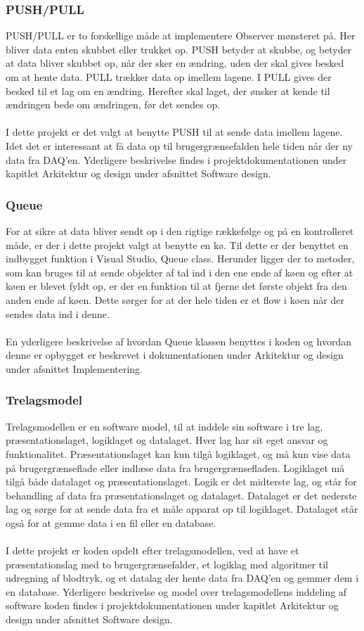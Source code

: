 \subsubsection{PUSH/PULL}
PUSH/PULL er to forskellige måde at implementere Observer mønsteret på. Her bliver data enten skubbet eller trukket op. PUSH betyder at skubbe, og betyder at data bliver skubbet op, når der sker en ændring, uden der skal gives besked om at hente data. PULL trækker data op imellem lagene. I PULL gives der besked til et lag om en ændring. Herefter skal laget, der ønsker at kende til ændringen bede om ændringen, før det sendes op.\\
\\
I dette projekt er det valgt at benytte PUSH til at sende data imellem lagene. Idet det er interessant at få data op til brugergrænsefalden hele tiden når der ny data fra DAQ’en. Yderligere beskrivelse findes i projektdokumentationen under kapitlet Arkitektur og design under afsnittet Software design. 
\subsubsection{Queue}
For at sikre at data bliver sendt op i den rigtige rækkefølge og på en kontrolleret måde, er der i dette projekt valgt at benytte en kø. Til dette er der benyttet en indbygget funktion i Visual Studio, Queue class. Herunder ligger der to metoder, som kan bruges til at sende objekter af tal ind i den ene ende af køen og efter at køen er blevet fyldt op, er der en funktion til at fjerne det første objekt fra den anden ende af køen. Dette sørger for at der hele tiden er et flow i køen når der sendes data ind i denne. \\
\\
En yderligere beskrivelse af hvordan Queue klassen benyttes i koden og hvordan denne er opbygget er beskrevet i dokumentationen under Arkitektur og design under afsnittet Implementering.
\subsubsection{Trelagsmodel}
Trelagsmodellen er en software model, til at inddele sin software i tre lag, præsentationslaget, logiklaget og datalaget. Hver lag har sit eget ansvar og funktionalitet. Præsentationslaget kan kun tilgå logiklaget, og må kun vise data på brugergrænseflade eller indlæse data fra brugergrænsefladen. Logiklaget må tilgå både datalaget og præsentationslaget. Logik er det midterste lag, og står for behandling af data fra præsentationslaget og datalaget. Datalaget er det nederste lag og sørge for at sende data fra et måle apparat op til logiklaget. Datalaget står også for at gemme data i en fil eller en database.\\
\\ 
I dette projekt er koden opdelt efter trelagsmodellen, ved at have et præsentationslag med to brugergrænsefalder, et logiklag med algoritmer til udregning af blodtryk, og et datalag der hente data fra DAQ’en og gemmer dem i en database.  Yderligere beskrivelse og model over trelagsmodellens inddeling af software koden findes i projektdokumentationen under kapitlet Arkitektur og design under afsnittet Software design.
